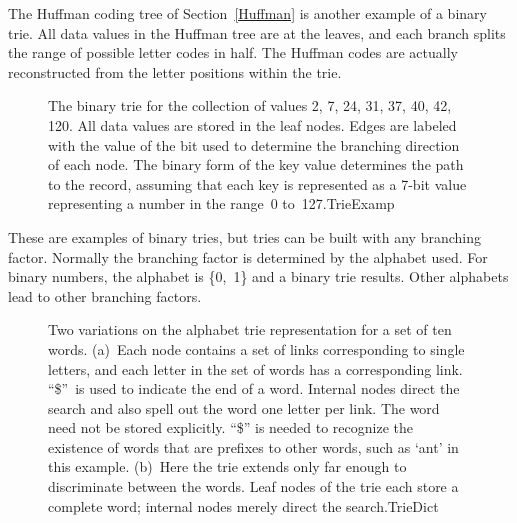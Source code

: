 The Huffman coding
tree of Section~\ref{Huffman} is another example
of a binary trie.
All data values in the Huffman tree are at the leaves, and
each branch splits the range of possible letter codes in half.
The Huffman codes are actually reconstructed from the letter positions
within the trie.

\begin{figure}
\vspace{-\medskipamount}

{The binary trie for the collection of values
2, 7, 24, 31, 37, 40, 42, 120.
All data values are stored in the leaf nodes.
Edges are labeled with the value of the bit used to determine the
branching direction of each node.
The binary form of the key value determines the path to the record,
assuming that each key is represented as a 7-bit value representing a
number in the range~0 to~127.}{TrieExamp}
\bigskip
\end{figure}

These are examples of binary tries, but tries can be built
with any branching factor.
Normally the branching factor is determined by the alphabet used.
For binary numbers, the alphabet is \{0,~1\} and a binary trie
results.
Other alphabets lead to other branching factors.

\begin{figure}
\vspace{1pt}
{Two variations on the alphabet trie representation for a set of ten
words.
(a)~Each node contains a set of links corresponding to single letters,
and each letter in the set of words has a corresponding link.
``\$''~is used to indicate the end of a word.
Internal nodes direct the search and also spell out the word one
letter per link.
The word need not be stored explicitly.
``\$'' is needed to recognize the existence of words that are prefixes 
to other words, such as `ant' in this example.
(b)~Here the trie extends only far enough to discriminate between the
words.
Leaf nodes of the trie each store a complete word; internal nodes
merely direct the search.}{TrieDict}
\bigskip
\end{figure}

